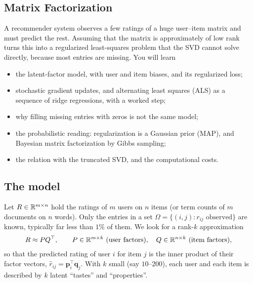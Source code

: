 \begin{notechapter}
\chapter{Matrix Factorization}\label{ch:matrix-factorization}

\begin{chapterintro}
A recommender system observes a few ratings of a huge user--item matrix and must
predict the rest. Assuming that the matrix is approximately of low rank turns this into
a regularized least-squares problem that the SVD cannot solve directly, because most
entries are missing. You will learn
\begin{itemize}[nosep]
  \item the latent-factor model, with user and item biases, and its regularized loss;
  \item stochastic gradient updates, and alternating least squares (ALS) as a sequence
        of ridge regressions, with a worked step;
  \item why filling missing entries with zeros is not the same model;
  \item the probabilistic reading: regularization is a Gaussian prior (MAP), and
        Bayesian matrix factorization by Gibbs sampling;
  \item the relation with the truncated SVD, and the computational costs.
\end{itemize}
\end{chapterintro}

\section{The model}\label{matrix-factorization:sec:model}

Let $R\in\mathbb{R}^{m\times n}$ hold the ratings of $m$ users on $n$ items (or term counts of $m$
documents on $n$ words). Only the entries in a set $\Omega = \{(i,j) : r_{ij}\text{ observed}\}$ are known,
typically far less than $1\%$ of them. We look for a rank-$k$ approximation
\[
  R\approx PQ^\top,\qquad P\in\R^{m\times k}\ \text{(user factors)},\quad Q\in\R^{n\times k}\ \text{(item factors)},
\]
so that the predicted rating of user $i$ for item $j$ is the inner product of their factor
vectors, $\hat r_{ij} = \mathbf p_i^\top\mathbf q_j$. With $k$ small (say $10$--$200$), each user and each item is
described by $k$ latent ``tastes'' and ``properties''.


\end{notechapter}
